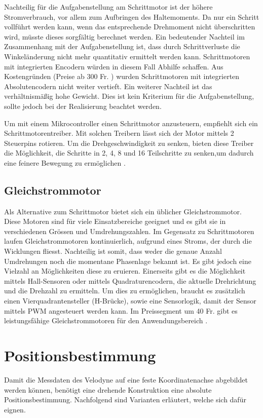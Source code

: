 Nachteilig für die Aufgabenstellung am Schrittmotor ist der höhere Stromverbrauch, vor allem zum Aufbringen des Haltemoments. Da nur ein Schritt vollführt werden kann, wenn das entsprechende Drehmoment nicht überschritten wird, müsste dieses sorgfältig berechnet werden. Ein bedeutender Nachteil im Zusammenhang mit der Aufgabenstellung ist, dass durch Schrittverluste die Winkeländerung nicht mehr quantitativ ermittelt werden kann. Schrittmotoren mit integrierten Encodern würden in diesem Fall Abhilfe schaffen. Aus Kostengründen (Preise ab 300 Fr. \cite{mouserstepper}) wurden Schrittmotoren mit integrierten Absolutencodern nicht weiter vertieft. 
Ein weiterer Nachteil ist das verhältnismäßig hohe Gewicht. Dies ist kein Kriterium für die Aufgabenstellung, sollte jedoch bei der Realisierung beachtet werden.

Um mit einem Mikrocontroller einen Schrittmotor anzusteuern, empfiehlt sich ein Schrittmotorentreiber. Mit solchen Treibern lässt sich der Motor mittels 2 Steuerpins rotieren. Um die Drehgeschwindigkeit zu senken, bieten diese Treiber die Möglichkeit, die Schritte in 2, 4, 8 und 16 Teilschritte zu senken,um dadurch eine feinere Bewegung zu ermöglichen \cite{DRV8825}.

\subsection{Gleichstrommotor}
\label{subsec:Gleichstrommotor}
Als Alternative zum Schrittmotor bietet sich ein üblicher Gleichstrommotor. Diese Motoren sind für viele Einsatzbereiche geeignet und es gibt sie in verschiedenen Grössen und Umdrehungszahlen. Im Gegensatz zu Schrittmotoren laufen Gleichstrommotoren kontinuierlich, aufgrund eines Stroms, der durch die Wicklungen fliesst. Nachteilig ist somit, dass weder die genaue Anzahl Umdrehungen noch die momentane Phasenlage bekannt ist. Es gibt jedoch eine Vielzahl an Möglichkeiten diese zu eruieren. Einerseits gibt es die Möglichkeit mittels Hall-Sensoren oder mittels Quadraturencodern, die aktuelle Drehrichtung und die Drehzahl zu ermitteln. Um dies zu ermöglichen, braucht es zusätzlich einen Vierquadrantensteller (H-Brücke), sowie eine Sensorlogik, damit der Sensor mittels \ac{PWM} angesteuert werden kann. Im Preissegment um 40 Fr. gibt es leistungsfähige Gleichstrommotoren für den Anwendungsbereich \cite{pololumotor}.

\section{Positionsbestimmung}
\label{sec:position}
Damit die Messdaten des Velodyne auf eine feste Koordinatenachse abgebildet werden können, benötigt eine drehende Konstruktion eine absolute Positionsbestimmung. Nachfolgend sind Varianten erläutert, welche sich dafür eignen.

